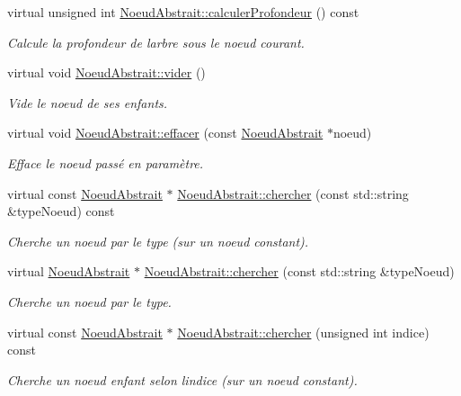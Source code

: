 \begin{DoxyCompactItemize}
virtual unsigned int \hyperlink{group__inf2990_gad854800087fd6c13f1a63589caefb41d}{Noeud\+Abstrait\+::calculer\+Profondeur} () const 
\begin{DoxyCompactList}\small\item\em Calcule la profondeur de l\textquotesingle{}arbre sous le noeud courant. \end{DoxyCompactList}\item 
virtual void \hyperlink{group__inf2990_ga55435ee83860c6a2101334ba67bbd9b6}{Noeud\+Abstrait\+::vider} ()
\begin{DoxyCompactList}\small\item\em Vide le noeud de ses enfants. \end{DoxyCompactList}\item 
virtual void \hyperlink{group__inf2990_ga2ab3dc520026d1ad77aa848981688bfd}{Noeud\+Abstrait\+::effacer} (const \hyperlink{class_noeud_abstrait}{Noeud\+Abstrait} $\ast$noeud)
\begin{DoxyCompactList}\small\item\em Efface le noeud passé en paramètre. \end{DoxyCompactList}\item 
virtual const \hyperlink{class_noeud_abstrait}{Noeud\+Abstrait} $\ast$ \hyperlink{group__inf2990_gaeda0df98faf404765d985fcde60fb924}{Noeud\+Abstrait\+::chercher} (const std\+::string \&type\+Noeud) const 
\begin{DoxyCompactList}\small\item\em Cherche un noeud par le type (sur un noeud constant). \end{DoxyCompactList}\item 
virtual \hyperlink{class_noeud_abstrait}{Noeud\+Abstrait} $\ast$ \hyperlink{group__inf2990_ga0868ae108165b071f6c8a68a7265c770}{Noeud\+Abstrait\+::chercher} (const std\+::string \&type\+Noeud)
\begin{DoxyCompactList}\small\item\em Cherche un noeud par le type. \end{DoxyCompactList}\item 
virtual const \hyperlink{class_noeud_abstrait}{Noeud\+Abstrait} $\ast$ \hyperlink{group__inf2990_gac334b078c318e39a065b85572778bf13}{Noeud\+Abstrait\+::chercher} (unsigned int indice) const 
\begin{DoxyCompactList}\small\item\em Cherche un noeud enfant selon l\textquotesingle{}indice (sur un noeud constant). \end{DoxyCompactList}\item 

\end{DoxyCompactItemize}
